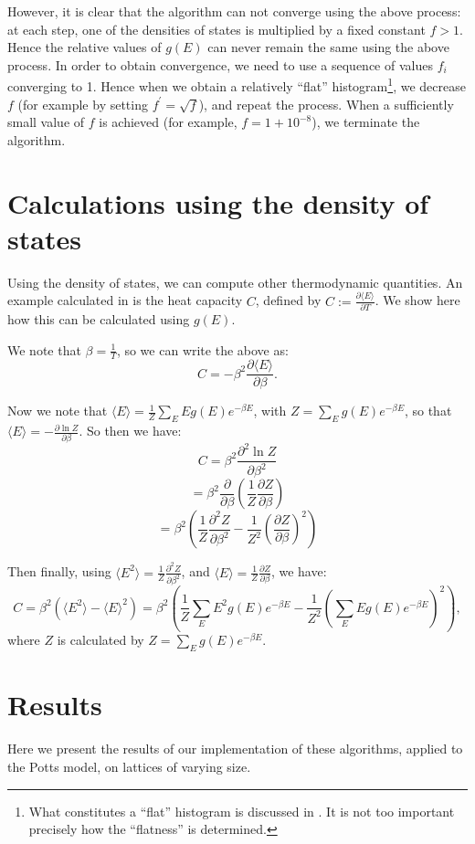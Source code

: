 \documentclass{article}
\begin{document}
However, it is clear that the algorithm can not converge using the above process: at each step, one of the densities of states is multiplied by a fixed constant $f>1$.
Hence the relative values of $g(E)$ can never remain the same using the above process.
In order to obtain convergence, we need to use a sequence of values $f_i$ converging to 1.
Hence when we obtain a relatively ``flat'' histogram\footnote{What constitutes a ``flat'' histogram is discussed in \cite{WangLandau}. It is not too important precisely how the ``flatness'' is determined.}, we decrease $f$ (for example by setting $f^\prime = \sqrt{f}$), and repeat the process.
When a sufficiently small value of $f$ is achieved (for example, $f = 1 + 10^{-8}$), we terminate the algorithm.

\section{Calculations using the density of states}
\label{sec:calculations}
Using the density of states, we can compute other thermodynamic quantities.
An example calculated in \cite{WangLandau} is the heat capacity $C$, defined by $C := \frac{\partial\langle E\rangle}{\partial T}$.
We show here how this can be calculated using $g(E)$.

We note that $\beta = \frac{1}{T}$, so we can write the above as:
$$ C = -\beta^2\frac{\partial\langle E\rangle}{\partial\beta}. $$

Now we note that $\langle E\rangle = \frac{1}{Z}\sum_E Eg(E)e^{-\beta E}$, with $Z = \sum_E g(E)e^{-\beta E}$, so that $\langle E\rangle = -\frac{\partial \ln Z}{\partial\beta}$.
So then we have:
$$ C = \beta^2\frac{\partial^2 \ln Z}{\partial\beta^2} $$
$$ = \beta^2\frac{\partial}{\partial\beta}\left(\frac{1}{Z}\frac{\partial Z}{\partial\beta}\right) $$
$$ = \beta^2\left(\frac{1}{Z}\frac{\partial^2 Z}{\partial\beta^2} - \frac{1}{Z^2}\left(\frac{\partial Z}{\partial\beta}\right)^2\right) $$

Then finally, using $\langle E^2\rangle = \frac{1}{Z}\frac{\partial^2 Z}{\partial\beta^2}$, and $\langle E\rangle = \frac{1}{Z}\frac{\partial Z}{\partial\beta}$, we have:
$$ C = \beta^2(\langle E^2 \rangle - \langle E \rangle^2) = \beta^2(\frac{1}{Z}\sum_E E^2g(E)e^{-\beta E} - \frac{1}{Z^2}(\sum_E Eg(E)e^{-\beta E})^2), $$
where $Z$ is calculated by $Z = \sum_E g(E)e^{-\beta E}$.

\section{Results}
Here we present the results of our implementation of these algorithms, applied to the Potts model, on lattices of varying size.
\end{document}
